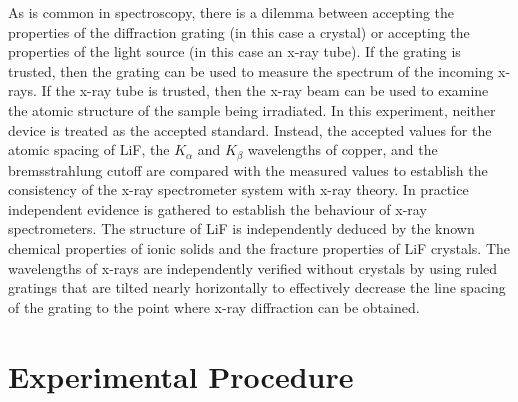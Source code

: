 \documentclass[12pt, a4paper, oneside, openright, titlepage]{book}
\begin{document}
\noindent As is common in spectroscopy, there is a dilemma between accepting the properties of the diffraction grating (in this case a crystal) or accepting the properties of the light source (in this case an x-ray tube). If the grating is trusted, then the grating can be used to measure the spectrum of the incoming x-rays. If the x-ray tube is trusted, then the x-ray beam can be used to examine the atomic structure of the sample being irradiated. In this experiment, neither device is treated as the accepted standard. Instead, the accepted values for the atomic spacing of LiF, the $K_{\alpha}$ and $K_{\beta}$ wavelengths of copper, and the bremsstrahlung cutoff are compared with the measured values to establish the consistency of the x-ray spectrometer system with x-ray theory. In practice independent evidence is gathered to establish the behaviour of x-ray spectrometers. The structure of LiF is independently deduced by the known chemical properties of ionic solids and the fracture properties of LiF crystals. The wavelengths of x-rays are independently verified without crystals by using ruled gratings that are tilted nearly horizontally to effectively decrease the line spacing of the grating to the point where x-ray diffraction can be obtained.

\section{Experimental Procedure}
\end{document}
